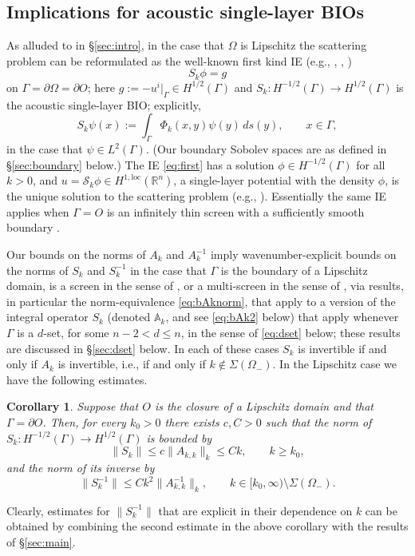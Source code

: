 \documentclass{birkjour}
\newtheorem{corollary}[theorem]{Corollary}
\theoremstyle{definition}
\theoremstyle{remark}
\numberwithin{equation}{section}
\newcommand{\R}{\mathbb{R}}
\newcommand{\Hol}{H^{1,\mathrm{loc}}}
\newcommand{\cS}{\mathcal{S}}
\newcommand{\bA}{\mathbb{A}}
\begin{document}
\subsection{Implications for acoustic single-layer BIOs} \label{sec:slp}

As alluded to in \S\ref{sec:intro}, in the case that $\Omega$ is Lipschitz the scattering problem can  be reformulated as the well-known first kind IE (e.g., \cite[\S3.2.1]{Ned}, \cite[Thm.~9.11]{mclean2000strongly}, \cite[Eqn.~(2.63]{chandler2012numerical})
\begin{equation} \label{eq:first}
S_k\phi=g 
\end{equation}
on $\Gamma=\partial \Omega = \partial O$; here $g:=-u^i|_\Gamma\in H^{1/2}(\Gamma)$ and $S_k:H^{-1/2}(\Gamma)\to H^{1/2}(\Gamma)$ is the acoustic single-layer BIO; explicitly,
\begin{equation} \label{eq:Sk}
S_k\psi(x) := \int_{\Gamma}\Phi_k(x,y)\psi(y)\,ds(y), \qquad x\in \Gamma,
\end{equation}
in the case that $\psi\in L^2(\Gamma)$. (Our boundary Sobolev spaces are as defined in \S\ref{sec:boundary} below.)
The IE \eqref{eq:first} has a solution $\phi\in H^{-1/2}(\Gamma)$ for all $k>0$, and $u=\cS_k \phi\in \Hol(\R^n)$, a single-layer potential with the density $\phi$, is the unique solution to the scattering problem (e.g., \cite[Thm.~9.11]{mclean2000strongly}). Essentially the same IE applies when $\Gamma=O$ is an infinitely thin screen with a sufficiently smooth boundary \cite{Stephan1987}.

Our bounds on the norms of $A_k$ and $A_k^{-1}$ imply wavenumber-explicit bounds on the norms of $S_k$ and $S_k^{-1}$ in the case that $\Gamma$ is the boundary of a Lipschitz domain, is a screen in the sense of \cite{Stephan1987}, or a multi-screen in the sense of \cite{ClaeysHiptmair2013}, via results, in particular the norm-equivalence \eqref{eq:bAknorm}, that apply to a version of the integral operator $S_k$ (denoted $\bA_k$, and see \eqref{eq:bAk2} below) that apply whenever $\Gamma$ is a $d$-set, for some $n-2<d\leq n$, in the sense of \eqref{eq:dset} below; these results are discussed in \S\ref{sec:dset} below. In each of these cases $S_k$ is invertible if and only if $A_k$ is invertible, i.e., if and only if $k\not\in \Sigma(\Omega_-)$. In the Lipschitz case we have the following estimates.

\begin{corollary} \label{thm:Sk0} 
Suppose that $O$ is the closure of a Lipschitz domain and that $\Gamma=\partial O$. Then, for every $k_0>0$ there exists $c,C>0$ such that the norm of $S_k:H^{-1/2}(\Gamma)\to H^{1/2}(\Gamma)$ is bounded by
$$
\|S_k\| \leq c\|A_{k,k}\|_k \leq Ck, \qquad k\geq k_0,
$$
and the norm of its inverse by
$$
\|S_k^{-1}\| \leq Ck^2\|A_{k,k}^{-1}\|_k, \qquad k\in [k_0,\infty)\setminus \Sigma(\Omega_-).
$$
\end{corollary}
\noindent Clearly, estimates for $\|S_k^{-1}\|$ that are explicit in their dependence on $k$ can be obtained by combining the second estimate in the above corollary with the results of \S\ref{sec:main}.
\end{document}

